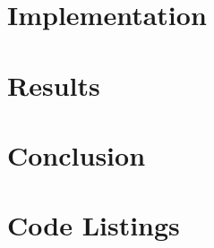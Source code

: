 \documentclass[12pt, openany, a4paper]{book}
\begin{document}
\chapter{Implementation}


\chapter{Results}


% 

\chapter{Conclusion}


\appendix


\newpage
{}
\mbox{}
\newpage




\chapter{Code Listings}

%

% 

 

\cleardoublepage


\end{document}
